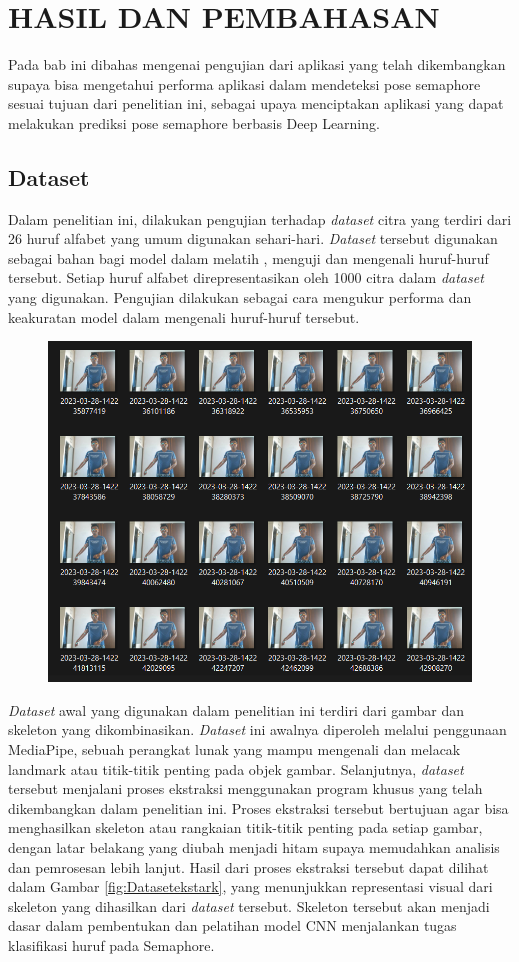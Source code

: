 \chapter{HASIL DAN PEMBAHASAN}
Pada bab ini dibahas mengenai pengujian dari aplikasi yang telah dikembangkan supaya bisa mengetahui performa aplikasi dalam mendeteksi pose semaphore sesuai tujuan dari penelitian ini, sebagai upaya menciptakan aplikasi yang dapat melakukan prediksi pose semaphore berbasis Deep Learning.

\section{Dataset}
Dalam penelitian ini, dilakukan pengujian terhadap \textit{dataset} citra yang terdiri dari 26 huruf alfabet yang umum digunakan sehari-hari. \textit{Dataset} tersebut digunakan sebagai bahan bagi  model dalam  melatih , menguji dan mengenali huruf-huruf tersebut. Setiap huruf alfabet direpresentasikan oleh 1000 citra dalam \textit{dataset} yang digunakan. Pengujian dilakukan sebagai cara mengukur performa dan keakuratan model dalam mengenali huruf-huruf tersebut.

\begin{figure}[!hbt]
	\centering
	\includegraphics[width=0.7\linewidth]{gambar/citra_dataset.png}
	\label{fig:Datasetraw}
\end{figure}

\textit{Dataset} awal yang digunakan dalam penelitian ini terdiri dari gambar dan skeleton yang dikombinasikan. \textit{Dataset} ini awalnya diperoleh melalui penggunaan MediaPipe, sebuah perangkat lunak yang mampu mengenali dan melacak landmark atau titik-titik penting pada objek gambar. Selanjutnya, \textit{dataset} tersebut menjalani proses ekstraksi menggunakan program khusus yang telah dikembangkan dalam penelitian ini. Proses ekstraksi tersebut bertujuan agar bisa menghasilkan skeleton atau rangkaian titik-titik penting pada setiap gambar, dengan latar belakang yang diubah menjadi hitam supaya memudahkan analisis dan pemrosesan lebih lanjut. Hasil dari proses ekstraksi tersebut dapat dilihat dalam Gambar \ref{fig:Datasetekstark}, yang menunjukkan representasi visual dari skeleton yang dihasilkan dari \textit{dataset} tersebut. Skeleton tersebut akan menjadi dasar dalam pembentukan dan pelatihan model CNN menjalankan tugas klasifikasi huruf pada Semaphore.

